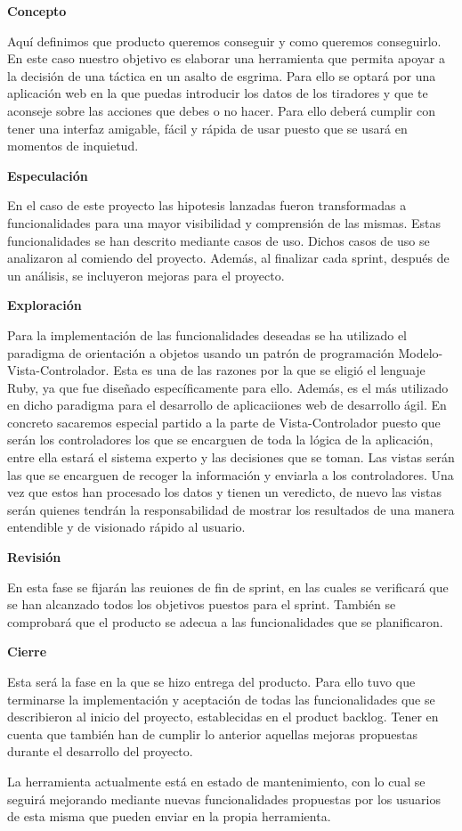 \textbf{Concepto}

Aquí definimos que producto queremos conseguir y como queremos conseguirlo. En este caso
 nuestro objetivo es elaborar una herramienta que permita apoyar a la decisión de una táctica
 en un asalto de esgrima. Para ello se optará por una aplicación web en la que puedas
 introducir los datos de los tiradores y que te aconseje sobre las acciones que debes o no
 hacer. Para ello deberá cumplir con tener una interfaz amigable, fácil y rápida de usar puesto
 que se usará en momentos de inquietud.

\textbf{Especulación}

En el caso de este proyecto las hipotesis lanzadas fueron transformadas a funcionalidades
 para una mayor visibilidad y comprensión de las mismas. Estas funcionalidades se han descrito
 mediante casos de uso. Dichos casos de uso se analizaron al comiendo del proyecto. Además, al
 finalizar cada sprint, después de un análisis, se incluyeron mejoras para el proyecto.

\textbf{Exploración}

Para la implementación de las funcionalidades deseadas se ha utilizado el paradigma de orientación a objetos
 usando un patrón de programación Modelo-Vista-Controlador. Esta es una de las
 razones por la que se eligió el lenguaje Ruby, ya que
 fue diseñado específicamente para ello. Además, es el más utilizado en dicho paradigma para el
 desarrollo de aplicaciiones web de desarrollo ágil. En concreto sacaremos especial partido
 a la parte de Vista-Controlador puesto que serán los controladores los que se encarguen de
 toda la lógica de la aplicación, entre ella estará el sistema experto y las decisiones que se toman.
 Las vistas serán las que se encarguen de recoger la información y enviarla a los controladores.
 Una vez que estos han procesado los datos y tienen un veredicto, de nuevo las vistas serán
 quienes tendrán la responsabilidad de mostrar los resultados de una manera entendible y
 de visionado rápido al usuario.

\textbf{Revisión}

En esta fase se fijarán las reuiones de fin de sprint, en las cuales se verificará que se
 han alcanzado todos los objetivos puestos para el sprint. También se comprobará que el producto
 se adecua a las funcionalidades que se planificaron.

\textbf{Cierre}

Esta será la fase en la que se hizo entrega del producto. Para ello tuvo que terminarse
 la implementación y aceptación de todas las funcionalidades que se describieron al inicio
 del proyecto, establecidas en el product backlog. Tener en cuenta que también han de cumplir
 lo anterior aquellas mejoras propuestas durante el desarrollo del proyecto.

La herramienta actualmente está en estado de mantenimiento, con lo cual se seguirá mejorando
 mediante nuevas funcionalidades propuestas por los usuarios de esta misma que pueden enviar
 en la propia herramienta.
